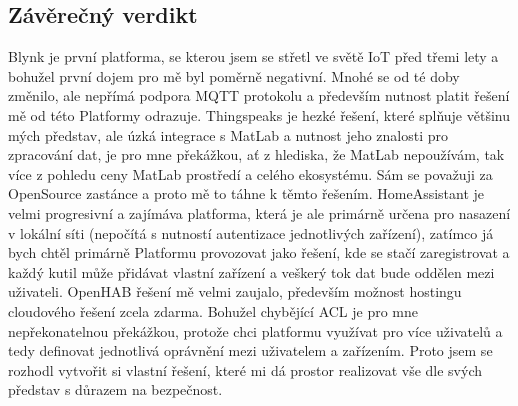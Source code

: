 \subsection{Závěrečný verdikt}
Blynk je první platforma, se kterou jsem se střetl ve světě IoT před třemi lety a bohužel první dojem pro mě byl poměrně negativní. Mnohé se od té doby změnilo, ale nepřímá podpora MQTT protokolu a především nutnost platit řešení mě od této Platformy odrazuje. Thingspeaks je hezké řešení, které splňuje většinu mých představ, ale úzká integrace s MatLab a nutnost jeho znalosti pro zpracování dat, je pro mne překážkou, ať z hlediska, že MatLab nepoužívám, tak více z pohledu ceny MatLab prostředí a celého ekosystému. Sám se považuji za OpenSource zastánce a proto mě to táhne k těmto řešením. HomeAssistant je velmi progresivní a zajímáva platforma, která je ale primárně určena pro nasazení v lokální síti (nepočítá s nutností autentizace jednotlivých zařízení), zatímco já bych chtěl primárně Platformu provozovat jako řešení, kde se stačí zaregistrovat a každý kutil může přidávat vlastní zařízení a veškerý tok dat bude oddělen mezi uživateli. OpenHAB řešení mě velmi zaujalo, především možnost hostingu cloudového řešení zcela zdarma. Bohužel chybějící ACL je pro mne nepřekonatelnou překážkou, protože chci platformu využívat pro více uživatelů a tedy definovat jednotlivá oprávnění mezi uživatelem a zařízením. Proto jsem se rozhodl vytvořit si vlastní řešení, které mi dá prostor realizovat vše dle svých představ s důrazem na bezpečnost.

